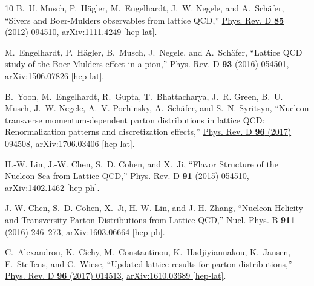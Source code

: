 \begin{thebibliography}{10}
B.~U. Musch, P.~Hägler, M.~Engelhardt, J.~W. Negele, and A.~Schäfer,
  ``{Sivers and Boer-Mulders observables from lattice QCD},''
  \href{http://dx.doi.org/10.1103/PhysRevD.85.094510}{Phys. Rev. D {\bfseries
  85} (2012) 094510},
\href{http://arxiv.org/abs/1111.4249}{{\ttfamily arXiv:1111.4249 [hep-lat]}}.

M.~Engelhardt, P.~Hägler, B.~Musch, J.~Negele, and A.~Schäfer, ``{Lattice QCD
  study of the Boer-Mulders effect in a pion},''
  \href{http://dx.doi.org/10.1103/PhysRevD.93.054501}{Phys. Rev. D {\bfseries
  93} (2016) 054501},
\href{http://arxiv.org/abs/1506.07826}{{\ttfamily arXiv:1506.07826 [hep-lat]}}.

B.~Yoon, M.~Engelhardt, R.~Gupta, T.~Bhattacharya, J.~R. Green, B.~U. Musch,
  J.~W. Negele, A.~V. Pochinsky, A.~Schäfer, and S.~N. Syritsyn, ``Nucleon
  transverse momentum-dependent parton distributions in lattice {QCD}:
  {R}enormalization patterns and discretization effects,''
  \href{http://dx.doi.org/10.1103/PhysRevD.96.094508}{Phys. Rev. D {\bfseries
  96} (2017) 094508},
\href{http://arxiv.org/abs/1706.03406}{{\ttfamily arXiv:1706.03406 [hep-lat]}}.

H.-W. Lin, J.-W. Chen, S.~D. Cohen, and X.~Ji, ``{Flavor Structure of the
  Nucleon Sea from Lattice QCD},''
  \href{http://dx.doi.org/10.1103/PhysRevD.91.054510}{Phys. Rev. D {\bfseries
  91} (2015) 054510},
\href{http://arxiv.org/abs/1402.1462}{{\ttfamily arXiv:1402.1462 [hep-ph]}}.

J.-W. Chen, S.~D. Cohen, X.~Ji, H.-W. Lin, and J.-H. Zhang, ``{Nucleon Helicity
  and Transversity Parton Distributions from Lattice QCD},''
  \href{http://dx.doi.org/10.1016/j.nuclphysb.2016.07.033}{Nucl. Phys. B
  {\bfseries 911} (2016) 246--273},
\href{http://arxiv.org/abs/1603.06664}{{\ttfamily arXiv:1603.06664 [hep-ph]}}.

C.~Alexandrou, K.~Cichy, M.~Constantinou, K.~Hadjiyiannakou, K.~Jansen,
  F.~Steffens, and C.~Wiese, ``Updated lattice results for parton
  distributions,'' \href{http://dx.doi.org/10.1103/PhysRevD.96.014513}{Phys.
  Rev. D {\bfseries 96} (2017) 014513},
\href{http://arxiv.org/abs/1610.03689}{{\ttfamily arXiv:1610.03689 [hep-lat]}}.


\end{thebibliography}
